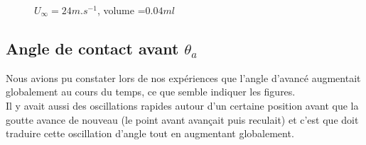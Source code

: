 \documentclass[french]{article}
\begin{document}
\begin{figure}[htp]
    \centering
	\caption{$U_{\infty}=24m.s^{-1}$, volume =$0.04ml$}
\end{figure}

\subsection{Angle de contact avant $\theta_{a}$}

Nous avions pu constater lors de nos expériences que l'angle d'avancé augmentait globalement au cours du temps, ce que semble indiquer les figures.\\

Il y avait aussi des oscillations rapides autour d'un certaine position avant que la goutte avance de nouveau (le point avant avançait puis reculait) et c'est que doit traduire cette oscillation d'angle tout en augmentant globalement.
\end{document}
